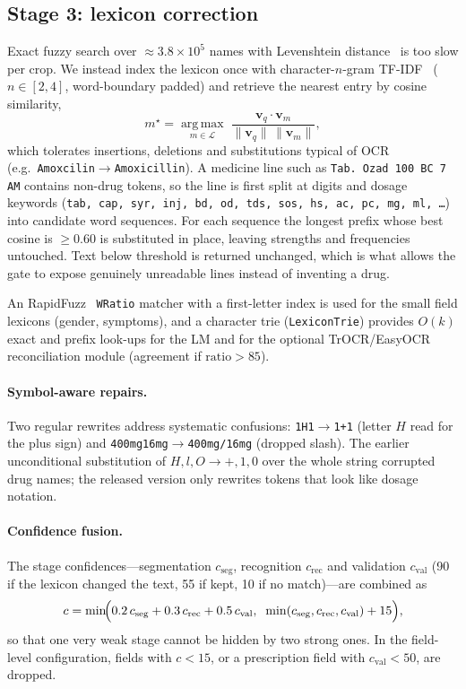 \documentclass[journal]{IEEEtran}
\begin{document}
\subsection{Stage 3: lexicon correction}\label{sec:lexicon}
Exact fuzzy search over $\approx3.8{\times}10^{5}$ names with Levenshtein distance~\cite{levenshtein1966binary} is too slow per crop. We instead index the lexicon once with character-$n$-gram TF-IDF~\cite{salton1988tfidf} ($n\in[2,4]$, word-boundary padded) and retrieve the nearest entry by cosine similarity,
\begin{equation}
m^\star=\operatorname*{arg\,max}_{m\in\mathcal{L}}\;\frac{\mathbf v_q\cdot\mathbf v_m}{\lVert\mathbf v_q\rVert\,\lVert\mathbf v_m\rVert},
\end{equation}
which tolerates insertions, deletions and substitutions typical of OCR (e.g.\ \texttt{Amoxcilin}$\to$\texttt{Amoxicillin}). A medicine line such as \texttt{Tab. Ozad 100 BC 7 AM} contains non-drug tokens, so the line is first split at digits and dosage keywords (\texttt{tab, cap, syr, inj, bd, od, tds, sos, hs, ac, pc, mg, ml, \ldots}) into candidate word sequences. For each sequence the longest prefix whose best cosine is $\ge 0.60$ is substituted in place, leaving strengths and frequencies untouched. Text below threshold is returned unchanged, which is what allows the gate to expose genuinely unreadable lines instead of inventing a drug.

An RapidFuzz~\cite{bachmann2020rapidfuzz} \texttt{WRatio} matcher with a first-letter index is used for the small field lexicons (gender, symptoms), and a character trie (\texttt{LexiconTrie}) provides $O(k)$ exact and prefix look-ups for the LM and for the optional TrOCR/EasyOCR reconciliation module (agreement if $\mathrm{ratio}>85$).

\paragraph{Symbol-aware repairs.} Two regular rewrites address systematic confusions: \texttt{1H1}$\to$\texttt{1+1} (letter $H$ read for the plus sign) and \texttt{400mg16mg}$\to$\texttt{400mg/16mg} (dropped slash). The earlier unconditional substitution of $H,l,O\to +,1,0$ over the whole string corrupted drug names; the released version only rewrites tokens that look like dosage notation.

\paragraph{Confidence fusion.} The stage confidences---segmentation $c_{\text{seg}}$, recognition $c_{\text{rec}}$ and validation $c_{\text{val}}$ (90 if the lexicon changed the text, 55 if kept, 10 if no match)---are combined as
\begin{equation}
c=\min\!\Bigl(0.2\,c_{\text{seg}}+0.3\,c_{\text{rec}}+0.5\,c_{\text{val}},\;\; \min(c_{\text{seg}},c_{\text{rec}},c_{\text{val}})+15\Bigr),
\label{eq:conf}
\end{equation}
so that one very weak stage cannot be hidden by two strong ones. In the field-level configuration, fields with $c<15$, or a prescription field with $c_{\text{val}}<50$, are dropped.
\end{document}

